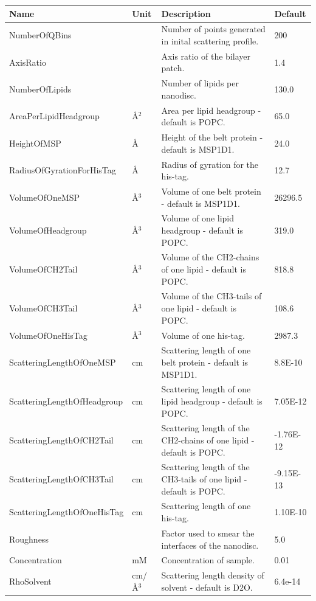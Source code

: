 \begin{longtable}{p{}p{}p{}p{}}
\toprule
\textbf{Name} & \textbf{Unit} & \textbf{Description} & \textbf{Default} \\
\midrule
\endhead
NumberOfQBins &  & Number of points generated in inital scattering profile. & 200 \\
AxisRatio &  & Axis ratio of the bilayer patch. & 1.4 \\
NumberOfLipids &  & Number of lipids per nanodisc. & 130.0 \\
AreaPerLipidHeadgroup & \AA{}$^{2}$ & Area per lipid headgroup - default is POPC. & 65.0 \\
HeightOfMSP & \AA{} & Height of the belt protein - default is MSP1D1. & 24.0 \\
RadiusOfGyrationForHisTag & \AA{} & Radius of gyration for the his-tag. & 12.7 \\
VolumeOfOneMSP & \AA{}$^{3}$ & Volume of one belt protein - default is MSP1D1. & 26296.5 \\
VolumeOfHeadgroup & \AA{}$^{3}$ & Volume of one lipid headgroup - default is POPC. & 319.0 \\
VolumeOfCH2Tail & \AA{}$^{3}$ & Volume of the CH2-chains of one lipid - default is POPC. & 818.8 \\
VolumeOfCH3Tail & \AA{}$^{3}$ & Volume of the CH3-tails of one lipid - default is POPC. & 108.6 \\
VolumeOfOneHisTag & \AA{}$^{3}$ & Volume of one his-tag. & 2987.3 \\
ScatteringLengthOfOneMSP & cm & Scattering length of one belt protein - default is MSP1D1. & 8.8E-10 \\
ScatteringLengthOfHeadgroup & cm & Scattering length of one lipid headgroup - default is POPC. & 7.05E-12 \\
ScatteringLengthOfCH2Tail & cm & Scattering length of the CH2-chains of one lipid - default is POPC. & -1.76E-12 \\
ScatteringLengthOfCH3Tail & cm & Scattering length of the CH3-tails of one lipid - default is POPC. & -9.15E-13 \\
ScatteringLengthOfOneHisTag & cm & Scattering length of one his-tag. & 1.10E-10 \\
Roughness &  & Factor used to smear the interfaces of the nanodisc. & 5.0 \\
Concentration & mM & Concentration of sample. & 0.01 \\
RhoSolvent & cm/\AA{}$^{3}$ & Scattering length density of solvent - default is D2O. & 6.4e-14 \\

\end{longtable}
